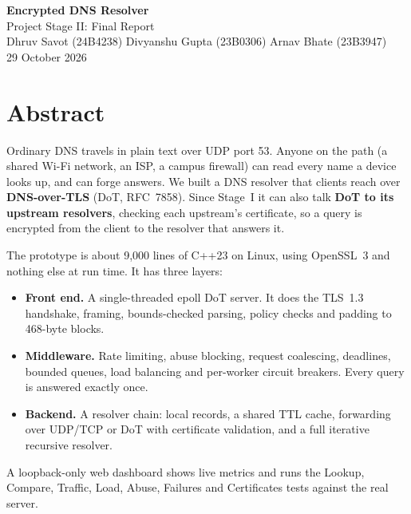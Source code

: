\documentclass[11pt,a4paper]{article}
\begin{document}
\begin{center}
  {\LARGE\bfseries Encrypted DNS Resolver}\\[4pt]
  {\large Project Stage II: Final Report}\\[8pt]
  Dhruv Savot (24B4238) \qquad Divyanshu Gupta (23B0306) \qquad Arnav Bhate (23B3947)\\[3pt]
  29 October 2026
\end{center}

\vspace*{-6ex}
{\small\tableofcontents}
\clearpage

\section{Abstract}

Ordinary DNS travels in plain text over UDP port 53. Anyone on the path (a shared Wi-Fi network, an ISP, a
campus firewall) can read every name a device looks up, and can forge answers. We built a DNS resolver that
clients reach over \textbf{DNS-over-TLS} (DoT, RFC~7858). Since Stage~I it can also talk \textbf{DoT to its
upstream resolvers}, checking each upstream's certificate, so a query is encrypted from the client to the
resolver that answers it.

The prototype is about 9{,}000 lines of C++23 on Linux, using OpenSSL~3 and nothing else at run time. It has three layers:
\begin{itemize}
  \item \textbf{Front end.} A single-threaded epoll DoT server. It does the TLS~1.3 handshake, framing,
  bounds-checked parsing, policy checks and padding to 468-byte blocks.
  \item \textbf{Middleware.} Rate limiting, abuse blocking, request coalescing, deadlines, bounded queues, load
  balancing and per-worker circuit breakers. Every query is answered exactly once.
  \item \textbf{Backend.} A resolver chain: local records, a shared TTL cache, forwarding over UDP/TCP or DoT
  with certificate validation, and a full iterative recursive resolver.
\end{itemize}
A loopback-only web dashboard shows live metrics and runs the Lookup, Compare, Traffic, Load, Abuse, Failures
and Certificates tests against the real server.
\end{document}
